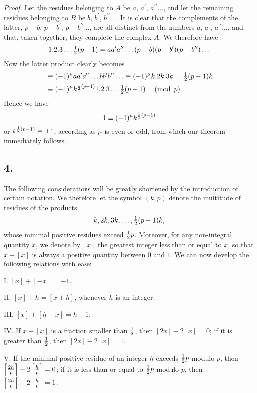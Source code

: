 \documentclass[twoside,12pt]{memoir}
\renewcommand{\pmod}[1]{\;(\textrm{mod.}\;#1)}
\let\oldfrac\frac
\def\frac#1#2{\mathchoice{\tfrac{#1}{#2}}{\oldfrac{#1}{#2}}{\genfrac{}{}{}{2}{#1}{#2\mathstrut}}{\genfrac{}{}{}{3}{#1}{#2\mathstrut}}}
\begin{document}
\textit{Proof.} Let the residues belonging to \(A\) be \(a\), \(a^{\prime}\), \(a^{\prime \prime} \ldots\), and let the remaining residues belonging to \(B\) be \(b\), \(b^{\prime}\), \(b^{\prime \prime} \ldots\). It is clear that the complements of the latter, \(p-b\), \(p-b^{\prime}\), \(p-b^{\prime \prime} \ldots\), are all distinct from the numbers \(a\), \(a^{\prime}\), \(a^{\prime \prime} \ldots\), and that, taken together, they complete the complex \(A\). We therefore have
\[1 . 2 . 3 \ldots \frac{1}{2}(p-1)=a a^{\prime} a^{\prime \prime} \ldots(p-b)(p-b^{\prime})(p-b^{\prime \prime}) \ldots\]
Now the latter product clearly becomes
\[\begin{aligned}
& \equiv(-1)^{\mu} a a^{\prime} a^{\prime \prime} \ldots b b^{\prime} b^{\prime \prime} \ldots \equiv(-1)^{\mu} k . 2 k .3 k \ldots \frac{1}{2}(p-1) k \\
& \equiv(-1)^{\mu} k^{\frac{1}{2}(p-1)} 1.2 .3 \ldots \frac{1}{2}(p-1) \quad\pmod{p}
\end{aligned}\]
Hence we have
\[1 \equiv(-1)^{\mu} k^{\frac{1}{2}(p-1)}\]
or \(k^{\frac{1}{2}(p-1)} \equiv \pm 1\), according as \(\mu\) is even or odd, from which our theorem immediately follows.
%

\subsection*{4.}

The following considerations will be greatly shortened by the introduction of certain notation. We therefore let the symbol \((k, p)\) denote the multitude of residues of the products
\[k, 2k, 3k, \ldots, \frac{1}{2}(p-1)k,\]
whose minimal positive residues exceed \(\frac{1}{2}p\). Moreover, for any non-integral quantity \(x\), we denote by \([x]\) the greatest integer less than or equal to \(x\), so that \(x-[x]\) is always a positive quantity between \(0\) and \(1\). We can now develop the following relations with ease:

I. \([x]+[-x]=-1\).

II. \([x]+h=[x+h]\), whenever \(h\) is an integer.

III. \([x]+[h-x]=h-1\).

IV. If \(x-[x]\) is a fraction smaller than \(\frac{1}{2}\), then \([2x]-2[x]=0\); if it is greater than \(\frac{1}{2}\), then \([2x]-2[x]=1\).

V. If the minimal positive residue of an integer \(h\) exceeds \(\frac{1}{2}p\) modulo \(p\), then \(\left[\frac{2h}{p}\right]-2\left[\frac{h}{p}\right]=0\); if it is less than or equal to \(\frac{1}{2}p\) modulo \(p\), then \(\left[\frac{2h}{p}\right]-2\left[\frac{h}{p}\right]=1\). 
\end{document}
